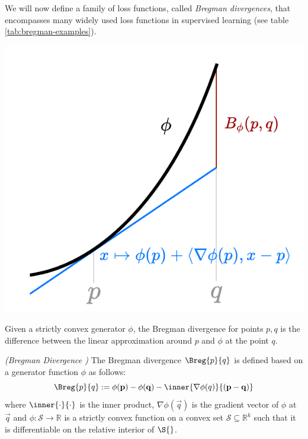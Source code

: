 \documentclass[
    a4paper, %
	fontsize=10pt, %
	twoside=false, %
]{kaobook}
\begin{document}
We will now define a family of loss functions, called \textit{Bregman divergences}, that encompasses many widely used loss functions in supervised learning (see table \ref{tab:bregman-examples}). 

\begin{marginfigure} \label{fig:bias-variance-tradeoff}
    \includegraphics[width=\textwidth]{figma-illustrations/bregman-div-intuition}
    \caption{Given a strictly convex generator $\phi$, the Bregman divergence for points $p, q$ is the difference between the linear approximation around $p$ and $\phi$ at the point $q$. }
\end{marginfigure}
\begin{definition} \label{def:bregman-divergence}
\textit{(Bregman Divergence \cite{todo})} The Bregman divergence $\Breg{p}{q}$  is defined based on a generator function $\phi$ as follows:
$$
\Breg{p}{q} := \phi(\vec{p}) - \phi(\vec{q}) - \inner{\nabla \phi(q)}{(\vec{p} - \vec{q})}
$$
where $\inner{\cdot}{\cdot}$ is the inner product, $\nabla \phi(\vec{q})$ is the gradient vector of $\phi$ at $\vec{q}$ and $\phi: \mathcal{S} \to \mathbb{R}$ is a strictly convex function on a convex set $\mathcal{S} \subseteq \mathbb{R}^k$ such that it is differentiable on the relative interior of $\mathcal{\S{}}$.
\end{definition}
\end{document}
